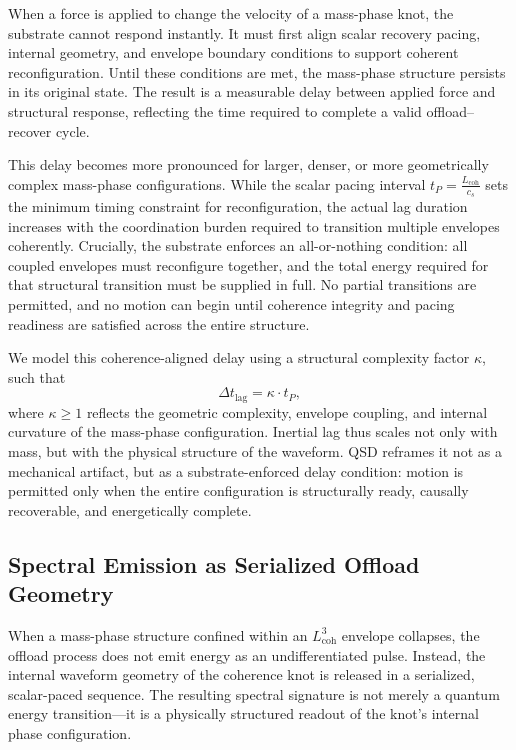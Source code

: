 \documentclass[entropy,article,submit,pdftex,oneauthor]{Definitions/mdpi}
\begin{document}
When a force is applied to change the velocity of a mass-phase knot, the substrate cannot respond instantly. It must first align scalar recovery pacing, internal geometry, and envelope boundary conditions to support coherent reconfiguration. Until these conditions are met, the mass-phase structure persists in its original state. The result is a measurable delay between applied force and structural response, reflecting the time required to complete a valid offload–recover cycle.

This delay becomes more pronounced for larger, denser, or more geometrically complex mass-phase configurations. While the scalar pacing interval \( t_P = \frac{L_{\text{coh}}}{c_s} \) sets the minimum timing constraint for reconfiguration, the actual lag duration increases with the coordination burden required to transition multiple envelopes coherently. Crucially, the substrate enforces an all-or-nothing condition: all coupled envelopes must reconfigure together, and the total energy required for that structural transition must be supplied in full. No partial transitions are permitted, and no motion can begin until coherence integrity and pacing readiness are satisfied across the entire structure.

We model this coherence-aligned delay using a structural complexity factor \( \kappa \), such that
\[
\Delta t_{\text{lag}} = \kappa \cdot t_P,
\]
where \( \kappa \geq 1 \) reflects the geometric complexity, envelope coupling, and internal curvature of the mass-phase configuration. Inertial lag thus scales not only with mass, but with the physical structure of the waveform. QSD reframes it not as a mechanical artifact, but as a substrate-enforced delay condition: motion is permitted only when the entire configuration is structurally ready, causally recoverable, and energetically complete.

\subsection{Spectral Emission as Serialized Offload Geometry}

When a mass-phase structure confined within an \texorpdfstring{\( L_{\text{coh}}^3 \)}{Lcoh\^{}3} envelope collapses, the offload process does not emit energy as an undifferentiated pulse. Instead, the internal waveform geometry of the coherence knot is released in a serialized, scalar-paced sequence. The resulting spectral signature is not merely a quantum energy transition—it is a physically structured readout of the knot’s internal phase configuration.
\end{document}
